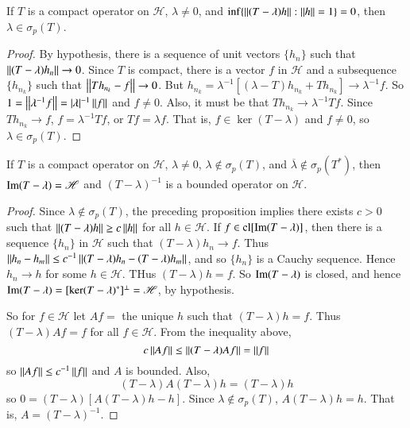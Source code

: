 \begin{prop}
    If $T$ is a compact operator on $\mathscr{H}$, $\lambda \neq 0$, and $\inf\{\left|\left| (T-\lambda)h\right|\right|:\left|\left| h\right|\right|=1\} = 0$, then $\lambda \in \sigma_p(T)$.
\end{prop}
\begin{proof}
    By hypothesis, there is a sequence of unit vectors $\{h_n\}$ such that $\left|\left| (T-\lambda)h_n\right|\right|\rightarrow 0$. Since $T$ is compact, there is a vector $f$ in $\mathscr{H}$ and a subsequence $\{h_{n_k}\}$ such that $\left|\left| Th_{n_k}-f\right|\right|\rightarrow 0$. But $h_{n_k} = \lambda^{-1}[(\lambda-T)h_{n_k}+Th_{n_k}]\rightarrow \lambda^{-1}f$. So $1 = \left|\left| \lambda^{-1}f\right|\right| = |\lambda|^{-1}\left|\left| f\right|\right|$ and $f \neq 0$. Also, it must be that $Th_{n_k}\rightarrow \lambda^{-1}Tf$. Since $Th_{n_k}\rightarrow f$, $f = \lambda^{-1}Tf$, or $Tf = \lambda f$. That is, $f \in \ker(T-\lambda)$ and $f \neq 0$, so $\lambda \in \sigma_p(T)$.
\end{proof}

\begin{cor}
    If $T$ is a compact operator on $\mathscr{H}$, $\lambda \neq 0$, $\lambda \notin\sigma_p(T)$, and $\overline{\lambda}\notin \sigma_p(T^*)$, then $\operatorname{Im}(T-\lambda) = \mathscr{H}$ and $(T-\lambda)^{-1}$ is a bounded operator on $\mathscr{H}$.
\end{cor}
\begin{proof}
    Since $\lambda \notin \sigma_p(T)$, the preceding proposition implies there exists $c > 0$ such that $\left|\left| (T-\lambda)h\right|\right| \geq c\left|\left| h\right|\right|$ for all $h \in \mathscr{H}$. If $f \in \text{cl}[\operatorname{Im}(T-\lambda)]$, then there is a sequence $\{h_n\}$ in $\mathscr{H}$ such that $(T-\lambda)h_n\rightarrow f$. Thus $\left|\left| h_n-h_m\right|\right|\leq c^{-1}\left|\left| (T-\lambda)h_n-(T-\lambda)h_m\right|\right|$, and so $\{h_n\}$ is a Cauchy sequence. Hence $h_n\rightarrow h$ for some $h \in \mathscr{H}$. THus $(T-\lambda)h = f$. So $\operatorname{Im}(T-\lambda)$ is closed, and hence $\operatorname{Im}(T-\lambda) = [\ker(T-\lambda)^*]^{\perp} = \mathscr{H}$, by hypothesis.

    So for $f \in \mathscr{H}$ let $Af = $ the unique $h$ such that $(T-\lambda)h = f$. Thus $(T-\lambda)Af = f$ for all $f \in \mathscr{H}$. From the inequality above, $$c\left|\left| Af\right|\right| \leq \left|\left| (T-\lambda)Af\right|\right| = \left|\left| f\right|\right|$$
    so $\left|\left| Af\right|\right| \leq c^{-1}\left|\left| f\right|\right|$ and $A$ is bounded. Also, $$(T-\lambda)A(T-\lambda)h = (T-\lambda)h$$
    so $0 = (T-\lambda)[A(T-\lambda)h-h]$. Since $\lambda \notin \sigma_p(T)$, $A(T-\lambda)h = h$. That is, $A = (T-\lambda)^{-1}$.
\end{proof}


